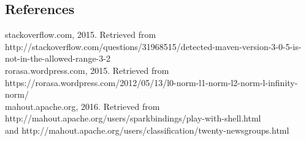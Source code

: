 \documentclass[10pt]{article}
\begin{document}
\subsection*{References}
stackoverflow.com, 2015. Retrieved from http://stackoverflow.com/questions/31968515/detected-maven-version-3-0-5-is-not-in-the-allowed-range-3-2\\
rorasa.wordpress.com, 2015. Retrieved from https://rorasa.wordpress.com/2012/05/13/l0-norm-l1-norm-l2-norm-l-infinity-norm/\\
mahout.apache.org, 2016. Retrieved from http://mahout.apache.org/users/sparkbindings/play-with-shell.html\\
and http://mahout.apache.org/users/classification/twenty-newsgroups.html
\end{document}
